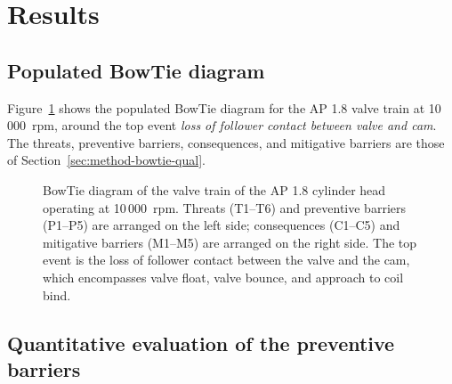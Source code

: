
\section{Results}\label{sec:results}

\subsection{Populated BowTie diagram}\label{sec:res-bowtie}

Figure~\ref{fig:bowtie} shows the populated BowTie diagram for the AP
1.8 valve train at 10\,000~rpm, around the top event \emph{loss of
follower contact between valve and cam}. The threats, preventive
barriers, consequences, and mitigative barriers are those of
Section~\ref{sec:method-bowtie-qual}.


\begin{figure}[!htbp]
 \centering
 \resizebox{\textwidth}{!}{}
 \caption{BowTie diagram of the valve train of the AP 1.8 cylinder head operating at 10\,000~rpm. Threats (T1--T6) and preventive barriers (P1--P5) are arranged on the left side; consequences (C1--C5) and mitigative barriers (M1--M5) are arranged on the right side. The top event is the loss of follower contact between the valve and the cam, which encompasses valve float, valve bounce, and approach to coil bind.}\label{fig:bowtie}
\end{figure}

\subsection{Quantitative evaluation of the preventive barriers}
\label{sec:res-quant}

